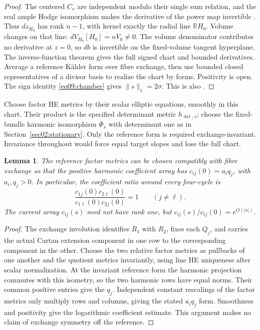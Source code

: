 \documentclass[11pt]{amsart}
\newtheorem{lemma}[theorem]{Lemma}
\theoremstyle{definition}
\theoremstyle{remark}
\newcommand{\RR}{\mathbb R}
\begin{document}
\begin{proof}
The centered \(C_v\) are independent modulo their single sum
relation, and the real ample Hodge isomorphism makes the derivative
of the power map invertible
\cite[Theorem~6.4 and Corollary~6.5]{grebrosstoma2016}.
Thus \(dz_{H_0}\) has rank \(n-1\), with kernel exactly the
radial line \(\RR H_0\). Volume changes on that line:
\(dV_{H_0}[H_0]=nV_0\ne0\). The volume denominator contributes
no derivative at \(z=0\), so \(db\) is invertible on the
fixed-volume tangent hyperplane. The inverse-function theorem gives
the full signed chart and bounded derivatives. Average a reference
Kähler form over fibre exchange, then use bounded closed
representatives of a divisor basis to realize the chart by forms.
Positivity is open. The sign identity \eqref{eq09:chamber} gives
\(\|s\|_1=2\sigma\). This is also
\cite[Proposition~9.1]{wuebben2026realization}.
\end{proof}

Choose factor HE metrics by their scalar elliptic equations, smoothly
in this chart. Their product is the specified determinant metric
\(h_{\det,s}\); choose the fixed-bundle harmonic isomorphism
\(\Phi_s\) with determinant one as in
Section~\ref{sec02:stationary}. Only the reference form is required
exchange-invariant. Invariance throughout would force equal target
slopes and lose the full chart.

\begin{lemma}\label{lem09:symmetry}
The reference factor metrics can be chosen compatibly with fibre
exchange so that the positive harmonic coefficient array has
\(c_{ij}(0)=a_iq_j\), with \(a_i,q_j>0\). In particular, the
coefficient ratio around every four-cycle is
\[
 \frac{c_{1j}(0)c_{2\ell}(0)}{c_{1\ell}(0)c_{2j}(0)}=1
 \qquad(j\ne\ell).
\]
The current array \(c_{ij}(s)\) need not have rank one,
but \(c_{ij}(s)/c_{ij}(0)=e^{O(|s|)}\).
\end{lemma}

\begin{proof}
The exchange involution identifies \(R_1\) with \(R_2\), fixes
each \(Q_j\), and carries the actual Cartan extension component
in one row to the corresponding component in the other. Choose
the two relative factor metrics as pullbacks of one another and
the quotient metrics invariantly, using line HE uniqueness after
scalar normalization. At the invariant reference form the harmonic
projection commutes with this isometry, so the two harmonic rows
have equal norms. Their common positive entries give the \(q_j\).
Independent constant rescalings of the factor metrics only multiply
rows and columns, giving the stated \(a_iq_j\) form. Smoothness
and positivity give the logarithmic coefficient estimate. This
argument makes no claim of exchange symmetry off the reference.
\end{proof}
\end{document}
